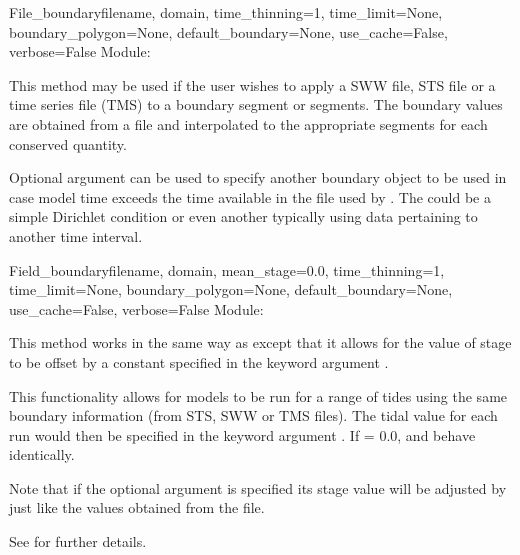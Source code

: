 \documentclass{manual}
\begin{document}
\begin{classdesc}{File_boundary}{filename,
                                 domain,
                                 time_thinning=1,
                                 time_limit=None,
                                 boundary_polygon=None,
                                 default_boundary=None,
                                 use_cache=False,
                                 verbose=False}
Module: 

This method may be used if the user wishes to apply a SWW file, STS file or
a time series file (TMS) to a boundary segment or segments.
The boundary values are obtained from a file and interpolated to the
appropriate segments for each conserved quantity.

Optional argument  can be used to specify another boundary object
to be used in case model time exceeds the time available in the file used by .
The  could be a simple Dirichlet condition or
even another  typically using data pertaining to another time interval.
\end{classdesc}

\begin{classdesc}{Field_boundary}{filename,
                                  domain,
                                  mean_stage=0.0,
                                  time_thinning=1,
                                  time_limit=None,
                                  boundary_polygon=None,
                                  default_boundary=None,
                                  use_cache=False,
                                  verbose=False}
Module: 

This method works in the same way as  except that it
allows for the value of stage to be offset by a constant specified in the
keyword argument .

This functionality allows for models to be run for a range of tides using
the same boundary information (from STS, SWW or TMS files). The tidal value
for each run would then be specified in the keyword argument .
If  = 0.0,  and 
behave identically.

Note that if the optional argument  is specified
its stage value will be adjusted by  just like the values
obtained from the file.

See  for further details.
\end{classdesc}
\end{document}
